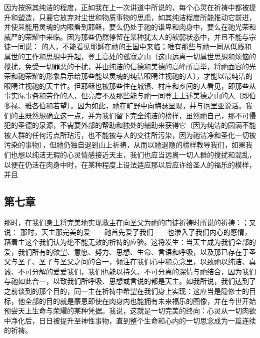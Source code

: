 因为按照其纯洁的程度，正如我在上一次讲道中所说的，每个心灵在祈祷中都被提升和塑造，只要它放弃对尘世和物质事物的思虑，如其纯洁程度所能推动它前进，并使其能用灵魂的内眼看到耶稣，要么仍处于祂的谦卑和肉身中，要么在祂光荣和威严的荣耀中来临。因为那些仍然停留在某种犹太人的软弱状态中，并且不能与宗徒一同说：  的人，不能看见耶稣在祂的王国中来临；唯有那些与祂一同从低贱和属世的工作和思想中升起，登上高处的孤寂之山（这山远离一切属世思想和烦恼的搅扰，免受一切罪恶的干扰，并由纯洁的信德和美德的高峰所高举，将祂面容的光荣和祂荣耀的形象启示给那些能以灵魂的纯洁眼睛注视祂的人），才能以最纯洁的眼睛注视祂的天主性。但耶稣也被那些住在城镇、村庄和乡间的人看见，即那些从事实际事务和劳作的人，但亮度不及那些能与祂一同登上上述美德之山的人（即伯多禄、雅各伯和若望）。因为如此，祂在旷野中向梅瑟显现，并与厄里亚说话。我们的主既然想确立这一点，并为我们留下完全纯洁的榜样，虽然祂自己，那不可侵犯的圣德的泉源，不需要外部的帮助和独处的辅助来获得它（因为纯洁的圆满不能被人群的任何污点所玷污，也不能被与人的交往所污染，因为祂洁净和圣化一切被污染的事物），但祂仍独自退到山上祈祷，从而以祂退隐的榜样教导我们，如果我们也想以纯洁无瑕的心灵情感接近天主，我们也应当远离一切人群的搅扰和混乱，以便在仍活在肉身中时，在某种程度上设法适应那以后应许给圣人的福乐的模样，并且 \par


\subsection{第七章}

\par

那时，在我们身上将完美地实现救主在向圣父为祂的门徒祈祷时所说的祈祷：；又说： 那时，天主那完美的爱——祂首先爱了我们——也渗入了我们内心的感情，藉着主这个我们认为绝不能无效的祈祷的应验。这将发生：当天主成为我们全部的爱，我们所有的欲望、意愿、努力、思想、生命、言语和呼吸，以及那已存在于圣父与圣子、圣子与圣父之间的合一，倾注在我们心中和意念里，以致祂以纯洁、真诚、不可分解的爱爱我们，我们也能以持久、不可分离的深情与祂结合，因为我们与祂如此合一，以致我们所呼吸、思想或言说的都是天主。如我所说，我们达到了之前谈到的那个目的，同一主在祈祷中希望在我们身上实现：这应当是隐修士的目标，他全部的目的就是蒙恩即使在肉身内也能拥有未来福乐的图像，并在今世开始预尝天上生命与荣耀的某种凭据。我说，这就是一切完美的终向：心灵从一切肉欲中净化后，日日被提升至神性事物，直到整个生命和心内的一切思念成为一篇连续的祈祷。\par

